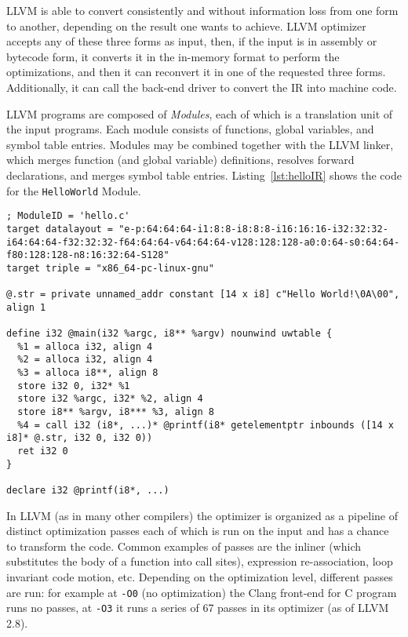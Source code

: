 LLVM is able to convert consistently and without information loss from one form to another, depending on the result one wants to achieve. LLVM optimizer accepts any of these three forms as input, then, if the input is in assembly or bytecode form, it converts it in the in-memory format to perform the optimizations, and then it can reconvert it in one of the requested three forms. Additionally, it can call the back-end driver to convert the IR into machine code.

LLVM programs are composed of \emph{Modules}, each of which is a translation unit of the input programs. Each module consists of functions, global variables, and symbol table entries. Modules may be combined together with the LLVM linker, which merges function (and global variable) definitions, resolves forward declarations, and merges symbol table entries. Listing~\ref{lst:helloIR} shows the code for the \texttt{HelloWorld} Module.

\begin{lstlisting}[caption={Example of IR code}, label={lst:helloIR}, float = ht]
; ModuleID = 'hello.c'
target datalayout = "e-p:64:64:64-i1:8:8-i8:8:8-i16:16:16-i32:32:32-i64:64:64-f32:32:32-f64:64:64-v64:64:64-v128:128:128-a0:0:64-s0:64:64-f80:128:128-n8:16:32:64-S128"
target triple = "x86_64-pc-linux-gnu"

@.str = private unnamed_addr constant [14 x i8] c"Hello World!\0A\00", align 1

define i32 @main(i32 %argc, i8** %argv) nounwind uwtable {
  %1 = alloca i32, align 4
  %2 = alloca i32, align 4
  %3 = alloca i8**, align 8
  store i32 0, i32* %1
  store i32 %argc, i32* %2, align 4
  store i8** %argv, i8*** %3, align 8
  %4 = call i32 (i8*, ...)* @printf(i8* getelementptr inbounds ([14 x i8]* @.str, i32 0, i32 0))
  ret i32 0
}

declare i32 @printf(i8*, ...)
\end{lstlisting}

In LLVM (as in many other compilers) the optimizer is organized as a pipeline of distinct optimization passes each of which is run on the input and has a chance to transform the code. Common examples of passes are the inliner (which substitutes the body of a function into call sites), expression re-association, loop invariant code motion, etc. Depending on the optimization level, different passes are run: for example at \texttt{-O0} (no optimization) the Clang front-end for C program runs no passes, at \texttt{-O3} it runs a series of 67 passes in its optimizer (as of LLVM 2.8).

